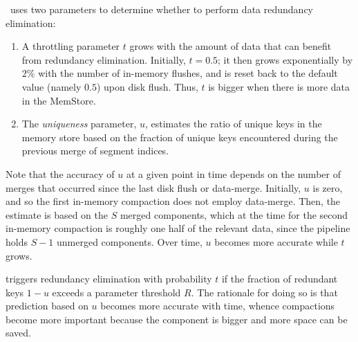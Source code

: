 \adp\ uses two parameters to determine whether to perform data redundancy elimination:
\begin{enumerate}
\item
A throttling parameter $t$  grows with the amount of data that can benefit from redundancy elimination. 
Initially, $t=0.5$; it then grows exponentially by $2\%$ with the number of in-memory flushes, and is reset back to 
the default value (namely $0.5$) upon disk flush. Thus, $t$ is bigger when there is more data in the MemStore.
\item
The \emph{uniqueness} parameter, $u$, estimates the ratio of unique keys in the memory store based on the 
fraction of unique keys encountered during the previous merge of segment indices. 
\end{enumerate}

Note that the accuracy of $u$ at a given point in time depends on the number of merges that occurred since the last disk flush
or data-merge.
Initially, $u$ is zero, and so the first in-memory compaction does not employ data-merge.
Then, the estimate is based on the $S$ merged components, which at the time for the second in-memory compaction
is roughly one half of the relevant data, since the pipeline holds $S-1$ unmerged components. 
Over time, $u$ becomes more accurate while $t$ grows. 

\adp\/ triggers redundancy elimination with probability $t$ if the fraction of redundant keys $1-u$ exceeds a parameter 
threshold $R$. The rationale for doing so is that prediction based on $u$ becomes more accurate with time, whence 
compactions become more important because the component is bigger and more space can be saved.


